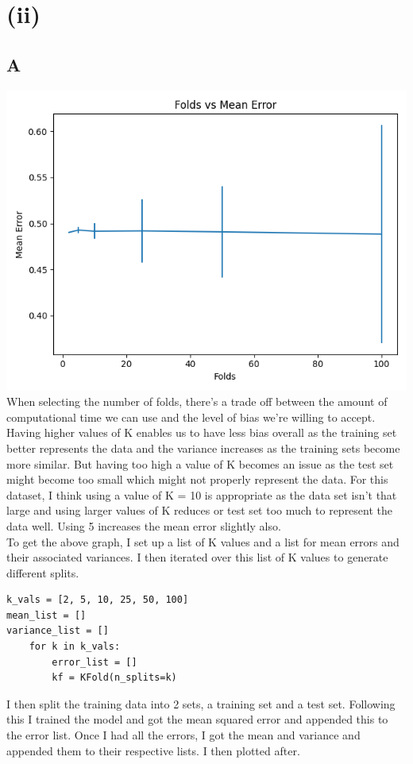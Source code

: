 \documentclass[11pt]{article} %
\begin{document}
\section{(ii)} 
\subsection{A}
\includegraphics[scale=0.4]{fold.jpg}
\\
When selecting the number of folds, there's a trade off between the amount of computational time we can use and the level of bias we're willing to accept. Having higher values of K enables us to have less bias overall as the training set better represents the data and the variance increases as the training sets become more similar. But having too high a value of K becomes an issue as the test set might become too small which might not properly represent the data. For this dataset, I think using a value of K = 10 is appropriate as the data set isn't that large and using larger values of K reduces or test set too much to represent the data well. Using 5 increases the mean error slightly also.
\\ To get the above graph, I set up a list of K values and a list for mean errors and their associated variances.  I then iterated over this list of K values to generate different splits.
\begin{verbatim}
k_vals = [2, 5, 10, 25, 50, 100]
mean_list = []
variance_list = []
    for k in k_vals:
        error_list = []
        kf = KFold(n_splits=k)
\end{verbatim}
I then split the training data into 2 sets, a training set and a test set. Following this I trained the model and got the mean squared error and appended this to the error list. Once I had all the errors, I got the mean and variance and appended them to their respective lists. I then plotted after.
\end{document}

